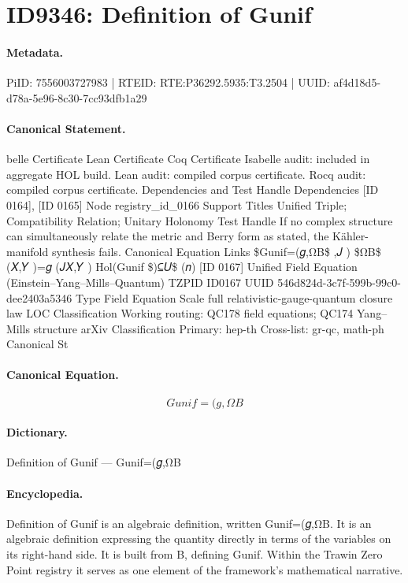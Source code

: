 \section*{ID9346: Definition of Gunif}
\paragraph{Metadata.}
PiID: 7556003727983 | RTEID: RTE:P36292.5935:T3.2504 | UUID: af4d18d5-d78a-5e96-8c30-7cc93dfb1a29

\paragraph{Canonical Statement.}
belle Certificate Lean Certificate Coq Certificate Isabelle audit: included in aggregate HOL build. Lean audit: compiled corpus certificate. Rocq audit: compiled corpus certificate. Dependencies and Test Handle Dependencies [ID 0164], [ID 0165] Node registry\_id\_0166 Support Titles Unified Triple; Compatibility Relation; Unitary Holonomy Test Handle If no complex structure can simultaneously relate the metric and Berry form as stated, the Kähler-manifold synthesis fails. Canonical Equation Links \$Gunif=(𝑔,ΩB\$ ,𝐽 ) \$ΩB\$ (𝑋,𝑌 )=𝑔 (𝐽𝑋,𝑌 ) Hol(Gunif \$)⊆𝑈\$ (𝑛) [ID 0167] Unified Field Equation (Einstein–Yang–Mills–Quantum) TZPID ID0167 UUID 546d824d-3c7f-599b-99c0-dee2403a5346 Type Field Equation Scale full relativistic-gauge-quantum closure law LOC Classification Working routing: QC178 field equations; QC174 Yang–Mills structure arXiv Classification Primary: hep-th Cross-list: gr-qc, math-ph Canonical St

\paragraph{Canonical Equation.}
\[
Gunif=(𝑔,ΩB
\]

\paragraph{Dictionary.}
Definition of Gunif — Gunif=(𝑔,ΩB

\paragraph{Encyclopedia.}
Definition of Gunif is an algebraic definition, written Gunif=(𝑔,ΩB. It is an algebraic definition expressing the quantity directly in terms of the variables on its right-hand side. It is built from B, defining Gunif. Within the Trawin Zero Point registry it serves as one element of the framework's mathematical narrative.
